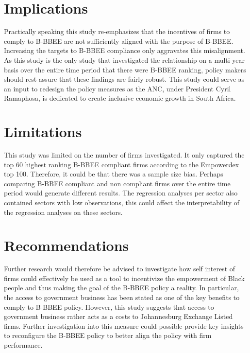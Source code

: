 \section{Implications}
Practically speaking this study re-emphasizes that the incentives of firms to comply to B-BBEE are not sufficiently aligned with the purpose of B-BBEE. Increasing the targets to B-BBEE compliance only aggravates this misalignment. As this study is the only study that investigated the relationship on a multi year basis over the entire time period that there were B-BBEE ranking, policy makers should rest assure that these findings are fairly robust. This study could serve as an input to redesign the policy measures as the ANC, under President Cyril Ramaphosa, is dedicated to create inclusive economic growth in South Africa. 
\section{Limitations}
This study was limited on the number of firms investigated. It only captured the top 60 highest ranking B-BBEE compliant firms according to the Empowerdex top 100. Therefore, it could be that there was a sample size bias. Perhaps comparing B-BBEE compliant and non compliant firms over the entire time period would generate different results. The regression analyses per sector also contained sectors with low observations, this could affect the interpretability of the regression analyses on these sectors.
\section{Recommendations}
Further research would therefore be advised to investigate how self interest of firms could effectively be used as a tool to incentivize the empowerment of Black people and thus making the goal of the B-BBEE policy a reality. In particular, the access to government business has been stated as one of the key benefits to comply to B-BBEE policy. However, this study suggests that access to government business rather acts as a costs to Johannesburg Exchange Listed firms. Further investigation into this measure could possible provide key insights to reconfigure the B-BBEE policy to better align the policy with firm performance.
